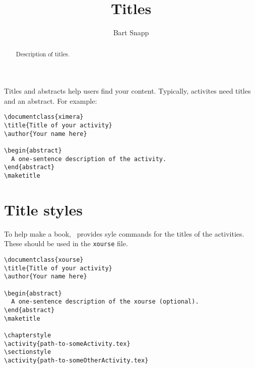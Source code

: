 


\title{Titles}

\author{Bart Snapp}


\begin{abstract}
  Description of titles.
\end{abstract}
\maketitle

Titles and abstracts help users find your content. Typically,
activites need titles and an abstract.  For example:

\begin{verbatim}
\documentclass{ximera}
\title{Title of your activity}
\author{Your name here}

\begin{abstract}
  A one-sentence description of the activity.
\end{abstract}
\maketitle

\end{verbatim}



\section{Title styles}


To help make a book, \ximera\ provides syle commands for the titles of the activities. These should be used in the \verb|xourse| file. 

\begin{verbatim}
\documentclass{xourse}
\title{Title of your activity}
\author{Your name here}

\begin{abstract}
  A one-sentence description of the xourse (optional).
\end{abstract}
\maketitle

\chapterstyle
\activity{path-to-someActivity.tex}
\sectionstyle
\activity{path-to-someOtherActivity.tex}


\end{verbatim}



